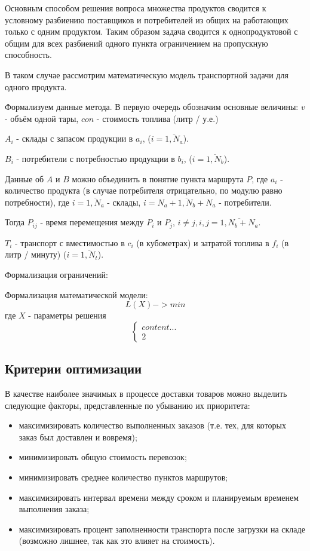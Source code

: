 	Основным способом решения вопроса множества продуктов сводится к условному разбиению поставщиков и потребителей из общих на работающих только с одним продуктом. Таким образом задача сводится к однопродуктовой с общим для всех разбиений одного пункта ограничением на пропускную способность.
	
	В таком случае рассмотрим математическую модель транспортной задачи для одного продукта.
	
	Формализуем данные метода. В первую очередь обозначим основные величины: $v$ - объём одной тары, $con$ - стоимость топлива (литр / у.е.)
	
	$A_i$ - склады с запасом продукции в $a_i$, ($i = \overline{1, N_a}$).
	
	$B_i$ - потребители с потребностью продукции в $b_i$, ($i = \overline{1, N_b}$).
	
	Данные об $A$ и $B$ можно объединить в понятие пункта маршрута $P$, где $a_i$ - количество продукта (в случае потребителя отрицательно, по модулю равно потребности), где $i = \overline{1, N_a}$ - склады, $i = \overline{N_a+1, N_b+N_a}$ - потребители.
	
	Тогда $P_{ij}$ - время перемещения между $P_i$ и $P_j$, $i \ne j, i, j = \overline{1, N_b+N_a}$.
	
	$T_i$ - транспорт с вместимостью в $c_i$ (в кубометрах) и затратой топлива в $f_i$ (в литр / минуту) ($i = \overline{1, N_t}$).
	

	Формализация ограничений:

	
	Формализация математической модели:
	\begin{equation}
		L(X) -> min
	\end{equation}
	где $X$ - параметры решения
	\begin{equation}
		\left\lbrace
		\begin{array}{cols} 
			content... \\
			2
		\end{array}
	\end{equation}

\subsection{Критерии оптимизации}
	В качестве наиболее значимых в процессе доставки товаров можно выделить следующие факторы, представленные по убыванию их приоритета:
	\begin{itemize}
		\item максимизировать количество выполненных заказов (т.е. тех, для которых заказ был доставлен и вовремя);
		\item минимизировать общую стоимость перевозок;
		\item минимизировать среднее количество пунктов маршрутов;
		\item максимизировать интервал времени между сроком и планируемым временем выполнения заказа;
		\item максимизировать процент заполненности транспорта после загрузки на складе (возможно лишнее, так как это влияет на стоимость).
	\end{itemize}
\pagebreak